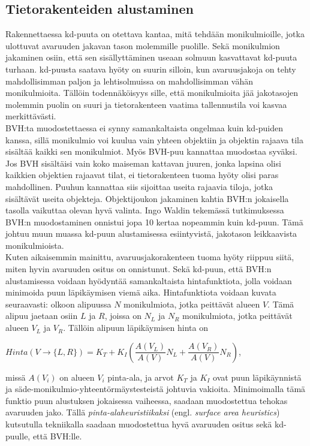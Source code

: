 \documentclass[a4paper, 12pt, titlepage]{article}
\begin{document}
\subsection{Tietorakenteiden alustaminen}

Rakennettaessa kd-puuta on otettava kantaa, mitä tehdään monikulmioille, jotka ulottuvat avaruuden jakavan tason molemmille puolille. Sekä monikulmion jakaminen osiin, että sen sisällyttäminen useaan solmuun kasvattavat kd-puuta turhaan. kd-puusta saatava hyöty on suurin silloin, kun avaruusjakoja on tehty mahdollisimman paljon ja lehtisolmuissa on mahdollisimman vähän monikulmioita. Tällöin todennäköisyys sille, että monikulmioita jää jakotasojen molemmin puolin on suuri ja tietorakenteen vaatima tallennustila voi kasvaa merkittävästi. \citep[.]{wald04} \\

BVH:ta muodostettaessa ei synny samankaltaista ongelmaa kuin kd-puiden kanssa, sillä monikulmio voi kuulua vain yhteen objektiin ja objektin rajaava tila sisältää kaikki sen monikulmiot. Myös BVH-puu kannattaa muodostaa syväksi. Jos BVH sisältäisi vain koko maiseman kattavan juuren, jonka lapsina olisi kaikkien objektien rajaavat tilat, ei tietorakenteen tuoma hyöty olisi paras mahdollinen. Puuhun kannattaa siis sijoittaa useita rajaavia tiloja, jotka sisältävät useita objekteja. Objektijoukon jakaminen kahtia BVH:n jokaisella tasolla vaikuttaa olevan hyvä valinta. \citep[.]{goldsmith} Ingo Waldin tekemässä tutkimuksessa BVH:n muodostaminen onnistui jopa 10 kertaa nopeammin kuin kd-puun. Tämä johtuu muun muassa kd-puun alustamisessa esiintyvistä, jakotason leikkaavista monikulmioista. \citep[.]{wald07}  \\

Kuten aikaisemmin mainittu, avaruusjakorakenteen tuoma hyöty riippuu siitä, miten hyvin avaruuden ositus on onnistunut. Sekä kd-puun, että BVH:n alustamisessa voidaan hyödyntää samankaltaista hintafunktiota, jolla voidaan minimoida puun läpikäymisen viemä aika. Hintafunktiota voidaan kuvata seuraavasti: olkoon alipuussa $N$ monikulmiota, jotka peittävät alueen $V$. Tämä alipuu jaetaan osiin $L$ ja $R$, joissa on $N_L$ ja $N_R$ monikulmiota, jotka peittävät alueen $V_L$ ja $V_R$. Tällöin alipuun läpikäymisen hinta on\\

\begin{centering} 
$Hinta(V\to\{L,R\}) = K_T + K_I \left(\dfrac{A(V_L)}{A(V)}N_L + \dfrac{A(V_R)}{A(V)}N_R \right)$,\\
\vspace{0.2cm}
\end{centering}
missä $A(V_i)$ on alueen $V_i$ pinta-ala, ja arvot $K_T$ ja $K_I$ ovat puun läpikäynnistä ja säde-monikulmio-yhteentörmäystesteistä johtuvia vakioita. Minimoimalla tämä funktio puun alustuksen jokaisessa vaiheessa, saadaan muodostettua tehokas avaruuden jako. \citep[.]{wald07} Tällä \emph{pinta-alaheuristiikaksi} (engl. \emph{surface area heuristics}) kutsutulla tekniikalla saadaan muodostettua hyvä avaruuden ositus sekä kd-puulle, että BVH:lle. 
\end{document}
